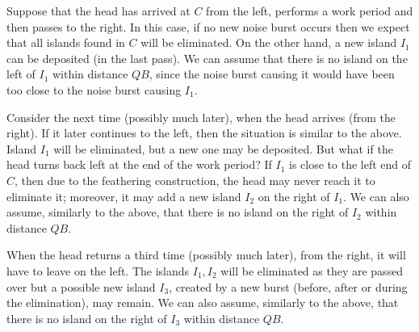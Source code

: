 \documentclass[12pt]{memoir}
\def\B{B}
\newcommand{\Q}{Q}
\begin{document}
\begin{example}\label{xmp:3-islands}
  Suppose that the head has arrived at \( C \) from the left,
performs a work period and then passes to the right.
In this case, if no new noise burst occurs then we expect that
all islands found in \( C \) will be eliminated.
On the other hand, a new island \( I_{1} \) can be deposited (in the last pass).
We can assume that there is no island on the left of  \( I_{1} \) 
within distance \( \Q\B \), since the noise burst
causing it would have been too close to the noise burst causing \( I_{1} \).

Consider the next time (possibly much later), when the head arrives (from the right).
If it later continues to the left, then the situation is similar to the above.
Island \( I_{1} \) will be eliminated, but a new one may be deposited.
But what if the head turns back left at the end of the work period?
If \( I_{1} \) is close to the left end of \( C \), then due to the feathering
construction, the head may never reach it to eliminate it; moreover,
it may add a new island \( I_{2} \) on the right of \( I_{1} \).
We can also assume, similarly to the above, 
that there is no island on the right of  \( I_{2} \) within distance \( \Q\B \).

When the head returns a third time (possibly much later), 
from the right, it will have to leave on the left.
The islands \( I_{1},I_{2} \) will be eliminated as they are passed over
but a possible new island
\( I_{3} \), created by a new burst (before, after or during the elimination), may remain.
We can also assume, similarly to the above, 
that there is no island on the right of  \( I_{3} \) within distance \( \Q\B \).
\end{example}
\end{document}
